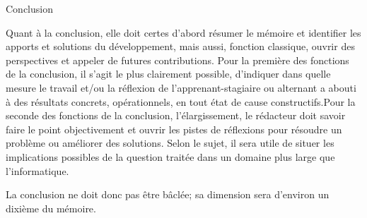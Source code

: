 \vfill
Conclusion

Quant à la conclusion, elle doit certes d’abord résumer le mémoire et identifier les apports et  solutions du  développement,  mais  aussi,  fonction  classique, ouvrir  des  perspectives et appeler de futures contributions. Pour la première des fonctions de la conclusion, il s’agit le plus clairement possible, d’indiquer dans quelle mesure le travail et/ou la réflexion de l’apprenant-stagiaire ou alternant a abouti à des résultats concrets, opérationnels, en tout état de cause constructifs.Pour la seconde des fonctions de la conclusion, l’élargissement, le rédacteur doit savoir faire le  point  objectivement  et  ouvrir  les  pistes  de réflexions pour  résoudre  un  problème  ou améliorer des solutions. Selon le sujet, il sera utile de situer les implications possibles de la question traitée dans un domaine plus large que l’informatique.

La  conclusion  ne  doit  donc  pas  être  bâclée;  sa  dimension sera d’environ un dixième du mémoire.
\vfill
